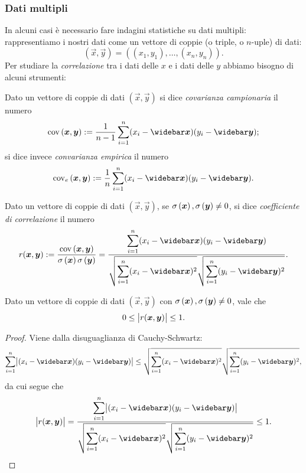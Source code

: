 \subsubsection{Dati multipli}
In alcuni casi è necessario fare indagini statistiche su dati multipli: rappresentiamo i nostri dati come un vettore di coppie (o triple, o $n$-uple) di dati: \[
    (\vec x, \vec y) = ((x_1, y_1), \dots, (x_n, y_n)).    
\] Per studiare la \emph{correlazione} tra i dati delle $x$ e i dati delle $y$ abbiamo bisogno di alcuni strumenti:
\begin{definition}
    [Covarianza] Dato un vettore di coppie di dati $(\vec x, \vec y)$ si dice \emph{covarianza campionaria} il numero \begin{equation}
        \cov{\vec x, \vec y} \deq \frac{1}{n-1}\sum_{i=1}^n (x_i - \mean x)(y_i - \mean y);
    \end{equation} si dice invece \emph{convarianza empirica} il numero \begin{equation}
        \cov*{\vec x, \vec y} \deq \frac{1}{n}\sum_{i=1}^n (x_i - \mean x)(y_i - \mean y).
    \end{equation}
\end{definition}

\begin{definition}
     Dato un vettore di coppie di dati $(\vec x, \vec y)$, se $\sd{\vec x}, \sd{\vec y} \neq 0$, si dice \emph{coefficiente di correlazione} il numero \[
        r(\vec x, \vec y) \deq \frac{\cov{\vec x, \vec y}}{\sd{\vec x}\sd{\vec y}} = \frac{\displaystyle\sum_{i=1}^n (x_i - \mean x)(y_i - \mean y)}{\displaystyle\sqrt{\sum_{i=1}^n (x_i-\mean x)^2}\sqrt{\sum_{i=1}^n (y_i-\mean y)^2}}.
    \]
\end{definition}

\begin{proposition}
    Dato un vettore di coppie di dati $(\vec x, \vec y)$ con $\sd{\vec x}, \sd{\vec y} \neq 0$, vale che \[
            0 \leq \abs[\big]{r(\vec x, \vec y)} \leq 1.
    \]
\end{proposition}
\begin{proof}
    Viene dalla disuguaglianza di Cauchy-Schwartz: \[
        \sum_{i=1}^n \abs[\big]{(x_i - \mean x)(y_i - \mean y)} \leq \sqrt{\sum_{i=1}^n (x_i-\mean x)^2}\sqrt{\sum_{i=1}^n (y_i-\mean y)^2},   
    \] da cui segue che \[
        \abs[\big]{r(\vec x, \vec y)} = \frac{\displaystyle\sum_{i=1}^n \abs[\big]{(x_i - \mean x)(y_i - \mean y)}}{\displaystyle\sqrt{\sum_{i=1}^n (x_i-\mean x)^2}\sqrt{\sum_{i=1}^n (y_i-\mean y)^2}} \leq 1. \qedhere
    \]
\end{proof}

